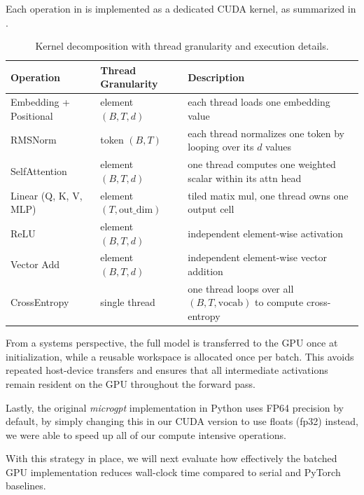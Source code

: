 Each operation in  is implemented as a dedicated CUDA kernel, as summarized in .


\begin{table}[t]
\centering
\begin{tabular}{l l l}
\toprule
\textbf{Operation} & \textbf{Thread Granularity} & \textbf{Description} \\
\midrule
Embedding + Positional & element $(B,T,d)$ & each thread loads one embedding value \\
RMSNorm & token $(B, T)$ & each thread normalizes one token by looping over its $d$ values  \\
SelfAttention & element $(B,T,d)$ & one thread computes one weighted scalar within its attn head \\
Linear (Q, K, V, MLP) & element $(T,\text{out\_dim})$ & tiled matix mul, one thread owns one output cell \\
ReLU & element $(B,T,d)$ & independent element-wise activation \\
Vector Add & element $(B,T,d)$ & independent element-wise vector addition \\
CrossEntropy & single thread & one thread loops over all $(B,T,\text{vocab})$ to compute cross-entropy \\
\bottomrule
\end{tabular}
\caption{Kernel decomposition with thread granularity and execution details.}
\label{tab:kernels}
\end{table}

From a systems perspective, the full model is transferred to the GPU once at initialization, while a reusable workspace is allocated once per batch. This avoids repeated host-device transfers and ensures that all intermediate activations remain resident on the GPU throughout the forward pass.

Lastly, the original \textit{microgpt} implementation in Python uses FP64 precision by default, by simply changing this in our CUDA version to use floats (fp32) instead, we were able to speed up all of our compute intensive operations.

With this strategy in place, we will next evaluate how effectively the batched GPU implementation reduces wall-clock time compared to serial and PyTorch baselines. 
